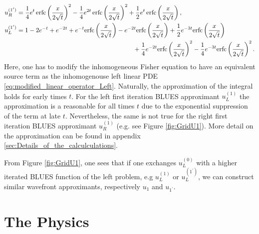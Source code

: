 \documentclass[amsmath,amssymb,amsfonts,aps,pre,preprint,superscriptaddress,bibnotes,showpacs,showkeys,longbibliography]{revtex4-1}
\DeclareMathOperator{\erfc}{erfc}
\begin{document}
\begin{align}
    u^{(1^\prime)}_R 
    &= \frac{1}{4} e^t \erfc\left(\frac{x}{2 \sqrt{t}}\right)^2-\frac{1}{4} e^{2 t} \erfc\left(\frac{x}{2 \sqrt{t}}\right)^2+\frac{1}{2} e^t \erfc\left(\frac{x}{2 \sqrt{t}}\right),\\
    u^{(1^\prime)}_L
    &=1-2 e^{-t}+e^{-2 t}+e^{-t} \text{erfc}\left(\frac{x}{2 \sqrt{t}}\right)-e^{-2 t} \text{erfc}\left(\frac{x}{2 \sqrt{t}}\right)+\frac{1}{2} e^{-3 t} \text{erfc}\left(\frac{x}{2 \sqrt{t}}\right) \notag \\
    &\hspace{6.5cm}+\frac{1}{4} e^{-2 t} \text{erfc}\left(\frac{x}{2 \sqrt{t}}\right)^2-\frac{1}{4} e^{-3 t} \text{erfc}\left(\frac{x}{2 \sqrt{t}}\right)^2.
\end{align}
Here, one has to modify the inhomogeneous Fisher equation to have an equivalent source term as the inhomogenouse left linear PDE \eqref{eq:modified_linear_operator_Left}.
Naturally, the approximation of the integral holds for early times $t$. For the left first iteration BLUES approximant $u^{(1)}_L$ the approximation is a reasonable for all times $t$ due to the exponential suppression of the term at late $t$. Nevertheless, the same is not true for the right first iteration BLUES approximant $u^{(1)}_R$ (e.g. see Figure \ref{fig:GridU1}). More detail on the approximation can be found in appendix \ref{sec:Details_of_the_calculculations}.


From Figure \ref{fig:GridU1}, one sees that if one exchanges $u^{(0)}_{L}$ with a higher iterated BLUES function of the left problem, e.g $u^{(1)}_{L}$ or $u^{(1^\prime)}_{L}$, we can construct similar wavefront approximants, respectively $u_1$ and $u_{1^\prime}$.

\section{The Physics}\label{sec:The_physics}
\end{document}
